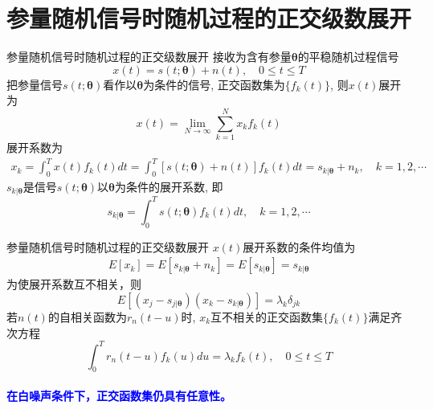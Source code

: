 \section{参量随机信号时随机过程的正交级数展开}

\begin{frame}[shrink]{参量随机信号时随机过程的正交级数展开}
接收为含有参量$\bm{\theta}$的平稳随机过程信号
\[x(t)=s(t; \bm{\theta})+n(t),\quad 0\le t\le T \]
把参量信号$s(t; \bm{\theta})$看作以$\bm{\theta}$为条件的信号, 正交函数集为$\{f_k(t)\}$, 则$x(t)$展开为
\[x(t)=\lim\limits_{N\to\infty}\sum_{k=1}^{N}x_kf_k(t) \]
展开系数为
\begin{align*}
x_k=\int_{0}^{T}x(t)f_k(t)dt=\int_{0}^{T}[s(t; \bm{\theta})+n(t)]f_k(t)dt=s_{k|\bm{\theta}}+n_k,\quad k=1,2,\cdots
\end{align*}
$s_{k|\bm{\theta}}$是信号$s(t; \bm{\theta})$以$\bm{\theta}$为条件的展开系数, 即
\[s_{k|\bm{\theta}}=\int_{0}^{T}s(t; \bm{\theta})f_k(t)dt,\quad  k=1,2,\cdots \]
\end{frame}

\begin{frame}[shrink]{参量随机信号时随机过程的正交级数展开}
$x(t)$展开系数的条件均值为
\begin{align*}
E[x_k]=E[s_{k|\bm{\theta}}+n_k]=E[s_{k|\bm{\theta}}]=s_{k|\bm{\theta}}
\end{align*}
为使展开系数互不相关，则
\[E[(x_j-s_{j|\bm{\theta}})(x_k-s_{k|\bm{\theta}})]=\lambda_k\delta_{jk} \]
若$n(t)$的自相关函数为$r_n(t-u)$时, $x_k$互不相关的正交函数集$\{f_k(t)\}$满足齐次方程
\[\int_{0}^{T}r_n(t-u)f_k(u)du=\lambda_kf_k(t), \quad 0\le t\le T \]
~\\
\textbf{\textcolor{blue}{在白噪声条件下，正交函数集仍具有任意性。}}
\end{frame}
